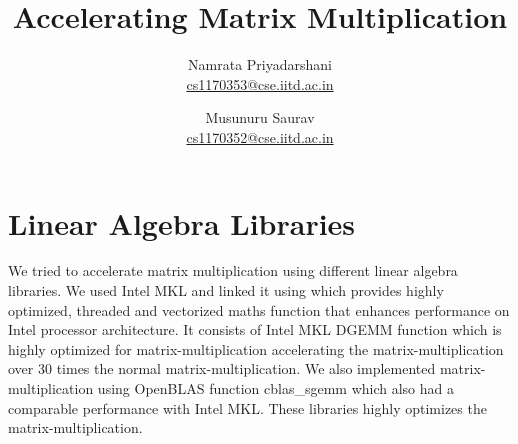 \documentclass[conf]{new-aiaa}
\title{Accelerating Matrix Multiplication}
\author{Namrata Priyadarshani \\ \href{mailto:cs1170353@cse.iitd.ac.in}{cs1170353@cse.iitd.ac.in}\and Musunuru Saurav \\ \href{mailto:cs1170352@cse.iitd.ac.in}{cs1170352@cse.iitd.ac.in}}
\begin{document}
\maketitle

\section{Linear Algebra Libraries}
We tried to accelerate matrix multiplication using different linear algebra libraries. We used Intel MKL\cite{mklLink} and linked it using
\cite{mklDocumnent} which provides highly optimized, threaded and vectorized maths function that enhances performance on Intel processor architecture. It consists of Intel MKL DGEMM function which is highly optimized for matrix-multiplication accelerating the matrix-multiplication over 30 times the normal matrix-multiplication. We also implemented matrix-multiplication using OpenBLAS\cite{openBlas} function cblas\_sgemm  which also had a comparable performance with Intel MKL. These libraries highly optimizes the matrix-multiplication.

\end{document}
